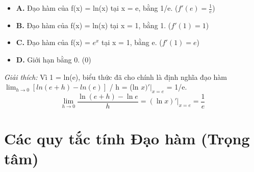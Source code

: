 \documentclass[11pt,a4paper,oneside]{book}
\begin{document}
\begin{enumerate}[label=\textbf{Câu \arabic*:}, leftmargin=2.2em, itemsep=8pt]
\begin{itemize}[label={}, leftmargin=1em, itemsep=2pt]
    \item \textbf{A.} Đạo hàm của f(x) = ln(x) tại x = e, bằng 1/e. \quad ($f'(e) = \frac{1}{e}$)
    \item \textbf{B.} Đạo hàm của f(x) = ln(x) tại x = 1, bằng 1. \quad ($f'(1) = 1$)
    \item \textbf{C.} Đạo hàm của f(x) = $e^x$ tại x = 1, bằng e. \quad ($f'(1) = e$)
    \item \textbf{D.} Giới hạn bằng 0. \quad ($0$)
  \end{itemize}
  \vspace{2pt}
   \textit{Giải thích:} Vì 1 = ln(e), biểu thức đã cho chính là định nghĩa đạo hàm $\lim_{h\to 0} [ln(e + h) - ln(e)]$ / h = (ln $x)'|_{x=e}$ = 1/e.
  \[ \lim_{h \to 0} \frac{\ln(e+h) - \ln e}{h} = \left.(\ln x)'\right|_{x=e} = \frac{1}{e} \]
\end{enumerate}

\chapter{Các quy tắc tính Đạo hàm (Trọng tâm)}
\label{chap:chuong-3}
\end{document}
